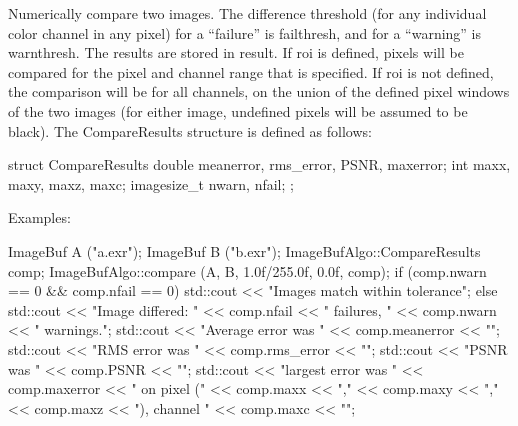  

Numerically compare two images.  The difference threshold (for any
individual color channel in any pixel) for a ``failure'' is
{\cf failthresh}, and for a ``warning'' is {\cf warnthresh}.  The 
results are stored in {\cf result}.  If {\cf roi} is defined, pixels
will be compared for the pixel and channel range that is specified.  If
{\cf roi} is not defined, the comparison will be for all channels, on
the union of the defined pixel windows of the two images (for either
image, undefined pixels will be assumed to be black).  The 
{\cf CompareResults} structure is defined as follows:
\begin{code}
struct CompareResults {
    double meanerror, rms_error, PSNR, maxerror;
    int maxx, maxy, maxz, maxc;
    imagesize_t nwarn, nfail;
};
\end{code}

\smallskip
\noindent Examples:
\begin{code}
    ImageBuf A ("a.exr");
    ImageBuf B ("b.exr");
    ImageBufAlgo::CompareResults comp;
    ImageBufAlgo::compare (A, B, 1.0f/255.0f, 0.0f, comp);
    if (comp.nwarn == 0 && comp.nfail == 0) {
        std::cout << "Images match within tolerance\n";
    } else {
        std::cout << "Image differed: " << comp.nfail << " failures, "
                  << comp.nwarn << " warnings.\n";
        std::cout << "Average error was " << comp.meanerror << "\n";
        std::cout << "RMS error was " << comp.rms_error << "\n";
        std::cout << "PSNR was " << comp.PSNR << "\n";
        std::cout << "largest error was " << comp.maxerror 
                  << " on pixel (" << comp.maxx << "," << comp.maxy 
                  << "," << comp.maxz << "), channel " << comp.maxc << "\n";
    }
\end{code}
\apiend

